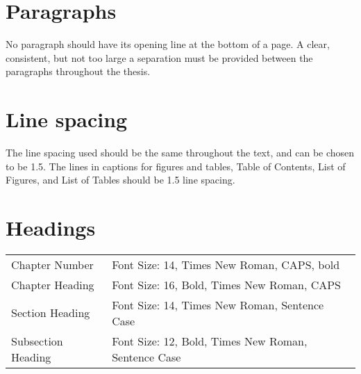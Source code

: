 \section{Paragraphs} 
No paragraph should have its opening line at the bottom of a page. A clear, consistent, but not too large a separation must be provided between the paragraphs throughout the thesis. 

\section{Line spacing}
The line spacing used should be the same throughout the text, and can be chosen to be 1.5. The lines in captions for figures and tables, Table of Contents, List of Figures, and List of Tables should be 1.5 line spacing. 

\section{Headings}
\begin{table}[htb]
	\begin{tabular}{ll}
		Chapter Number & Font Size:  14,  Times New Roman, CAPS, bold \\
      Chapter Heading & Font Size: 16, Bold, Times New Roman, CAPS \\
      Section Heading & Font Size: 14, Times New Roman, Sentence Case \\
		Subsection Heading & Font Size: 12, Bold, Times New Roman, Sentence Case
	\end{tabular}	
\end{table}


	
	

